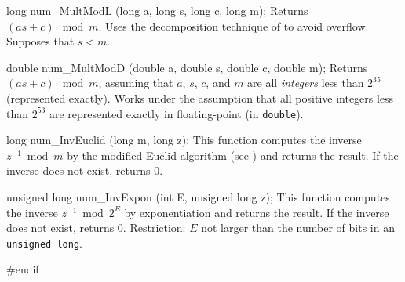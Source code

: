 long num_MultModL (long a, long s, long c, long m);
\endcode
\tab  Returns $(as + c) \mod m$.  Uses the decomposition technique
  of \cite{rLEC91a} to avoid overflow. Supposes that $s < m$.
\endtab
\code


double num_MultModD (double a, double s, double c, double m);
\endcode
 \tab  Returns $(as+c) \mod m$, assuming that
  $a$, $s$, $c$, and $m$ are all {\em integers\/} less than $2^{35}$ 
  (represented exactly).
  Works under the assumption that all positive integers less than 
  $2^{53}$ are represented exactly in floating-point (in {\tt double}).
\endtab
\code


long num_InvEuclid (long m, long z);
\endcode
 \tab  This function computes the inverse $z^{-1}\bmod m$ by the 
  modified Euclid algorithm (see \cite[p. 325]{iKNU81a}) and returns
  the result. If the inverse does not exist, returns 0.
\endtab
\code


unsigned long num_InvExpon (int E, unsigned long z);
\endcode
 \tab
  This function computes the inverse  $z^{-1} \bmod 2^E$
  by exponentiation  and returns the result. If the inverse does not
  exist, returns 0.
  Restriction: $E$ not larger than the number of bits
  in an {\tt unsigned long}.
 \endtab

\code
\hide
#endif
\endhide
\endcode
